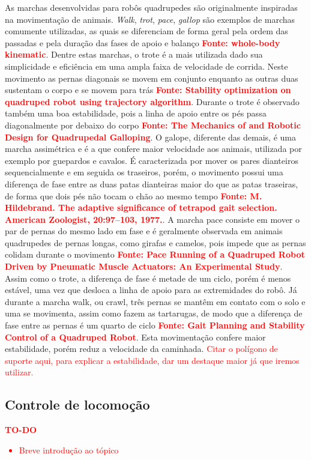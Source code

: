 \documentclass[../main.tex]{subfiles}
\begin{document}
  As marchas desenvolvidas para robôs quadrupedes são originalmente inspiradas na movimentação de animais. \textit{Walk}, \textit{trot}, \textit{pace}, \textit{gallop} são exemplos de marchas comumente utilizadas, as quais se diferenciam de forma geral pela ordem das passadas e pela duração das fases de apoio e balanço \textbf{\textcolor{red}{Fonte: whole-body kinematic}}. Dentre estas marchas, o trote é a mais utilizada dado sua simplicidade e eficiência em uma ampla faixa de velocidade de corrida. Neste movimento as pernas diagonais se movem em conjunto enquanto as outras duas sustentam o corpo e se movem para trás \textbf{\textcolor{red}{Fonte: Stability optimization on quadruped robot using trajectory algorithm}}. Durante o trote é observado também uma boa estabilidade, pois a linha de apoio entre os pés passa diagonalmente por debaixo do corpo \textbf{\textcolor{red}{Fonte: The Mechanics of and Robotic Design for Quadrupedal Galloping}}. O galope, diferente das demais, é uma marcha assimétrica e é a que confere maior velocidade aos animais, utilizada por exemplo por guepardos e cavalos. É caracterizada por mover os pares dianteiros sequencialmente e em seguida os traseiros, porém, o movimento possui uma diferença de fase entre as duas patas dianteiras maior do que as patas traseiras, de forma que dois pés não tocam o chão ao mesmo tempo \textbf{\textcolor{red}{Fonte: M. Hildebrand. The adaptive significance of tetrapod gait selection. American Zoologist, 20:97–103, 1977.}}. A marcha pace consiste em mover o par de pernas do mesmo lado em fase e é geralmente observada em animais quadrupedes de pernas longas, como girafas e camelos, pois impede que as pernas colidam durante o movimento \textbf{\textcolor{red}{Fonte: Pace Running of a Quadruped Robot Driven by Pneumatic Muscle Actuators: An Experimental Study}}. Assim como o trote, a diferença de fase é metade de um ciclo, porém é menos estável, uma vez que desloca a linha de apoio para as extremidades do robô. Já durante a marcha walk, ou crawl, três pernas se mantêm em contato com o solo e uma se movimenta, assim como fazem as tartarugas, de modo que a diferença de fase entre as pernas é um quarto de ciclo \textbf{\textcolor{red}{Fonte: Gait Planning and Stability Control of a Quadruped Robot}}. Esta movimentação confere maior estabilidade, porém reduz a velocidade da caminhada. \textcolor{red}{Citar o polígono de suporte aqui, para explicar a estabilidade, dar um destaque maior já que iremos utilizar.}


  \subsection{Controle de locomoção}
  \textcolor{red}{\textbf{TO-DO}
  \begin{itemize}
    \item Breve introdução ao tópico
  \end{itemize}
  }
\end{document}
